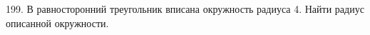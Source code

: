 199. В равносторонний треугольник вписана окружность радиуса 4. Найти радиус описанной окружности.\\
